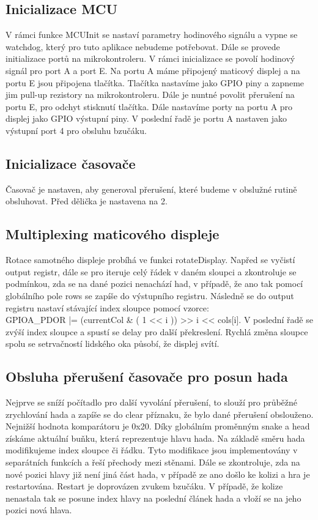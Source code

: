 \documentclass[12pt,english]{article}
\begin{document}
\subsection{Inicializace MCU}
V rámci funkce MCUInit se nastaví parametry hodinového signálu a vypne se watchdog, který pro tuto aplikace nebudeme potřebovat. Dále se provede initializace portů na mikrokontroleru. V rámci inicializace se povolí hodinový signál pro port A a port E. Na portu A máme připojený maticový displej a na portu E jsou připojena tlačítka. Tlačítka nastavíme jako GPIO piny a zapneme jim pull-up rezistory na mikrokontroleru. Dále je nuntné povolit přerušení na portu E, pro odchyt stisknutí tlačítka. Dále nastavíme porty na portu A pro displej jako GPIO výstupní piny. V poslední řadě je portu A nastaven jako výstupní port 4 pro obsluhu bzučáku.

\subsection{Inicializace časovače}
Časovač je nastaven, aby generoval přerušení, které budeme v obslužné rutině obsluhovat. Před dělička je nastavena na 2.

\subsection{Multiplexing maticového displeje}
Rotace samotného displeje probíhá ve funkci rotateDisplay. Napřed se vyčistí output registr, dále se pro iteruje celý řádek v daném sloupci a zkontroluje se podmínkou, zda se na dané pozici nenachází had, v případě, že ano tak pomocí globálního pole rows se zapíše do výstupního registru. Následně se do output registru nastaví stávající index sloupce pomocí vzorce:\\
GPIOA\_PDOR |= (currentCol & ( 1 << i )) >> i << cols[i]. V poslední řadě se zvýší index sloupce a spustí se delay pro další překreslení. Rychlá změna sloupce spolu se setrvačností lidského oka působí, že displej svítí.

\subsection{Obsluha přerušení časovače pro posun hada}
Nejprve se sníží počítadlo pro další vyvolání přerušení, to slouží pro průběžné zrychlování hada a zapíše se do clear příznaku, že bylo dané přerušení obslouženo. Nejnižší hodnota komparátoru je 0x20. Díky globálním proměnným snake a head získáme aktuální buňku, která reprezentuje hlavu hada. Na základě směru hada modifikujeme index sloupce či řádku. Tyto modifikace jsou implementovány v separátních funkcích a řeší přechody mezi stěnami. Dále se zkontroluje, zda na nové pozici hlavy již není jiná část hada, v případě ze ano došlo ke kolizi a hra je restartována. Restart je doprovázen zvukem bzučáku. V případě, že kolize nenastala tak se posune index hlavy na poslední článek hada a vloží se na jeho pozici nová hlava.
\end{document}
